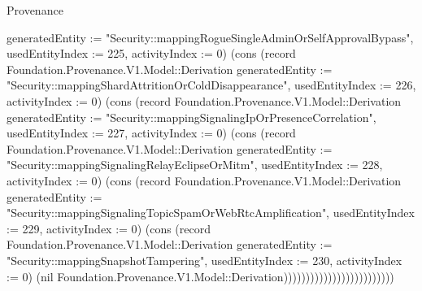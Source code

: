 \begin{lexlean}{Provenance}
\begin{semanticmodule}
{{generatedEntity := "Security::mappingRogueSingleAdminOrSelfApprovalBypass", usedEntityIndex := 225, activityIndex := 0}) (cons (record Foundation.Provenance.V1.Model::Derivation {generatedEntity := "Security::mappingShardAttritionOrColdDisappearance", usedEntityIndex := 226, activityIndex := 0}) (cons (record Foundation.Provenance.V1.Model::Derivation {generatedEntity := "Security::mappingSignalingIpOrPresenceCorrelation", usedEntityIndex := 227, activityIndex := 0}) (cons (record Foundation.Provenance.V1.Model::Derivation {generatedEntity := "Security::mappingSignalingRelayEclipseOrMitm", usedEntityIndex := 228, activityIndex := 0}) (cons (record Foundation.Provenance.V1.Model::Derivation {generatedEntity := "Security::mappingSignalingTopicSpamOrWebRtcAmplification", usedEntityIndex := 229, activityIndex := 0}) (cons (record Foundation.Provenance.V1.Model::Derivation {generatedEntity := "Security::mappingSnapshotTampering", usedEntityIndex := 230, activityIndex := 0}) (nil Foundation.Provenance.V1.Model::Derivation)))))))))))))))))))))))))
}


\end{semanticmodule}
\end{lexlean}

